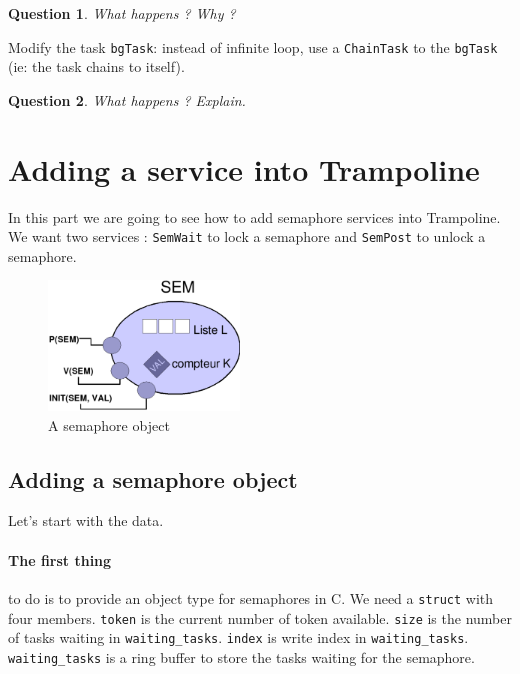 \documentclass[11pt]{article}
\newtheorem{ex}{Question}
\begin{document}
\begin{ex}
What happens ? Why ?
\end{ex}

Modify the task \texttt{bgTask}: instead of infinite loop, use a \texttt{ChainTask} to the \texttt{bgTask} (ie: the task chains to itself).

\begin{ex}
What happens ? Explain.
\end{ex}

\section{Adding a service into Trampoline}

In this part we are going to see how to add semaphore services into Trampoline. We want two services : \lstinline{SemWait} to lock a semaphore and \lstinline{SemPost} to unlock a semaphore.

\begin{figure}[htbp] %
   \centering
	\includegraphics[width=2in]{SemaphoreSEM.pdf}
   \caption{A semaphore object}
   \label{fig:example}
\end{figure}

\subsection{Adding a semaphore object}

Let's start with the data. 

\paragraph{The first thing} to do is to provide an object type for semaphores in C. We need a \lstinline{struct} with four members. \lstinline{token} is the current number of token available. \lstinline{size} is the number of tasks waiting in \lstinline{waiting_tasks}. \lstinline{index} is write index in \lstinline{waiting_tasks}. \lstinline{waiting_tasks} is a ring buffer to store the tasks waiting for the semaphore.
\end{document}

